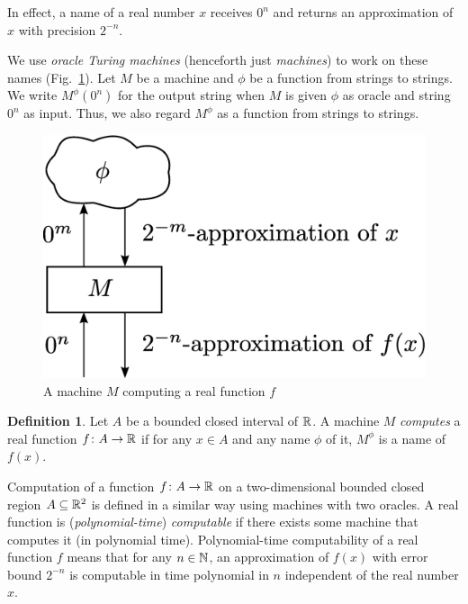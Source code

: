 \documentclass{article}
\theoremstyle{definition}
\newtheorem{definition}[theorem]{Definition}
\theoremstyle{remark}
\begin{document}
In effect, a name of a real number $x$ receives $0 ^n$ and 
returns an approximation of $x$ with precision $2 ^{-n}$.

We use \emph{oracle Turing machines} (henceforth just \emph{machines})
to work on these names (Fig.~\ref{fig:model-of-function}).
Let $M$ be a machine and $\phi$ be a function from strings to strings. 
We write $M ^\phi (0 ^n)$ for the output string 
when $M$ is given
$\phi$ as oracle and string $0^n$ as input.
Thus, we also regard $M^\phi$ as a function from strings to strings.

\begin{figure}
 \begin{center}
  \includegraphics[height=0.17\textheight]{image/model-of-function.eps}
 \end{center}
 \caption{A machine $M$ computing a real function $f$}
 \label{fig:model-of-function}
\end{figure}

\begin{definition}
Let $A$ be a bounded closed interval of\/ $\mathbb R$.
A machine $M$ \emph{computes} a real function $f \colon A \to \mathbb R$ 
if for any $x \in A$ and any name $\phi$ of it,
$M ^\phi$ is a name of $f(x)$.
\end{definition}

Computation of a function $f \colon A \to \mathbb R$ on
a two-dimensional bounded closed region $A \subseteq \mathbb R ^2$ 
is defined in a similar way using machines with two oracles.
A real function is (\emph{polynomial-time}) \emph{computable} if there exists some machine that computes it (in polynomial time).
Polynomial-time computability of a real function $f$ means that
for any $n \in \mathbb N$, 
an approximation of $f(x)$ with error bound $2^{-n}$
is computable in time polynomial in $n$ 
independent of the real number $x$.
\end{document}
